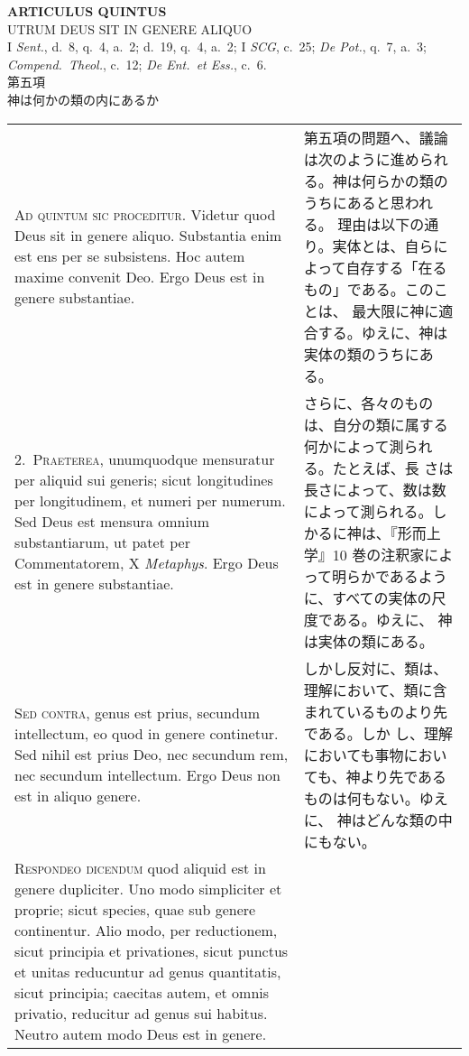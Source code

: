 \documentclass[10pt]{jsarticle} %
\begin{document}
\newpage
{}
\begin{center}
 {\Large {\bf ARTICULUS QUINTUS}}\\
 {\large UTRUM DEUS SIT IN GENERE ALIQUO}\\
 {\footnotesize I {\itshape Sent.}, d.~8, q.~4, a.~2; d.~19, q.~4, a.~2;
 I {\itshape SCG}, c.~25; {\itshape De Pot.}, q.~7, a.~3; {\itshape
 Compend.~Theol.}, c.~12; {\itshape De Ent.~et Ess.}, c.~6.}\\
 {\Large 第五項\\神は何かの類の内にあるか}
\end{center}

\begin{longtable}{p{21em}p{21em}}
{\huge A}{\scshape d quintum sic proceditur}. Videtur quod Deus sit in genere
 aliquo. Substantia enim est ens per se subsistens. Hoc autem maxime
 convenit Deo. Ergo Deus est in genere substantiae.

&

第五項の問題へ、議論は次のように進められる。神は何らかの類のうちにあると思われる。
理由は以下の通り。実体とは、自らによって自存する「在るもの」である。このことは、
 最大限に神に適合する。ゆえに、神は実体の類のうちにある。

\\

2.~{\scshape Praeterea}, unumquodque mensuratur per aliquid sui generis; sicut
 longitudines per longitudinem, et numeri per numerum. Sed Deus est
 mensura omnium substantiarum, ut patet per Commentatorem, X
 {\itshape Metaphys}. Ergo Deus est in genere substantiae.

&
さらに、各々のものは、自分の類に属する何かによって測られる。たとえば、長
 さは長さによって、数は数によって測られる。しかるに神は、『形而上学』10
 巻の注釈家によって明らかであるように、すべての実体の尺度である。ゆえに、
 神は実体の類にある。

\\

{\scshape Sed contra}, genus est prius, secundum intellectum, eo quod in genere
 continetur. Sed nihil est prius Deo, nec secundum rem, nec secundum
 intellectum. Ergo Deus non est in aliquo genere.

&
しかし反対に、類は、理解において、類に含まれているものより先である。しか
 し、理解においても事物においても、神より先であるものは何もない。ゆえに、
 神はどんな類の中にもない。

\\
{\scshape Respondeo dicendum} quod aliquid est in genere dupliciter.
Uno modo simpliciter et proprie; sicut species, quae sub genere continentur.
Alio modo, per reductionem, sicut principia et privationes, sicut
 punctus et unitas reducuntur ad genus quantitatis, sicut principia;
 caecitas autem, et omnis privatio, reducitur ad genus sui habitus.
Neutro autem modo Deus est in genere.


\end{longtable}
\end{document}
